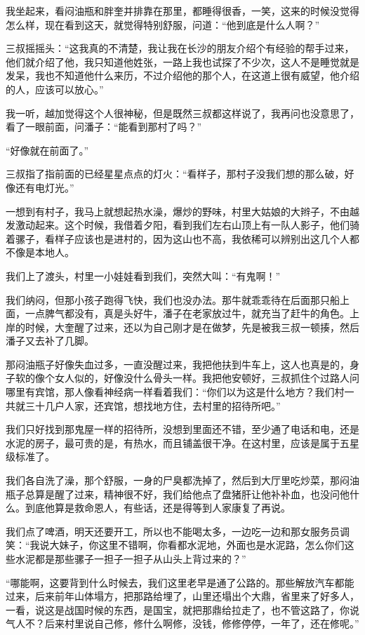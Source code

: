 我坐起来，看闷油瓶和胖奎并排靠在那里，都睡得很香，一笑，这来的时候没觉得怎么样，现在看到这天，就觉得特别舒服，问道：“他到底是什么人啊？”

三叔摇摇头：“这我真的不清楚，我让我在长沙的朋友介绍个有经验的帮手过来，他们就介绍了他，我只知道他姓张，一路上我也试探了不少次，这人不是睡觉就是发呆，我也不知道他什么来历，不过介绍他的那个人，在这道上很有威望，他介绍的人，应该可以放心。”

我一听，越加觉得这个人很神秘，但是既然三叔都这样说了，我再问也没意思了，看了一眼前面，问潘子：“能看到那村了吗？”

“好像就在前面了。”

三叔指了指前面的已经星星点点的灯火：“看样子，那村子没我们想的那么破，好像还有电灯光。”

一想到有村子，我马上就想起热水澡，爆炒的野味，村里大姑娘的大辫子，不由越发激动起来。这个时候，我借着夕阳，看到我们左右山顶上有一队人影子，他们骑着骡子，看样子应该也是进村的，因为这山也不高，我依稀可以辨别出这几个人都不像是本地人。

我们上了渡头，村里一小娃娃看到我们，突然大叫：“有鬼啊！”

我们纳闷，但那小孩子跑得飞快，我们也没办法。那牛就乖乖待在后面那只船上面，一点脾气都没有，真是头好牛，潘子在老家放过牛，就充当了赶牛的角色。上岸的时候，大奎醒了过来，还以为自己刚才是在做梦，先是被我三叔一顿揍，然后潘子又去补了几脚。

那闷油瓶子好像失血过多，一直没醒过来，我把他扶到牛车上，这人也真是的，身子软的像个女人似的，好像没什么骨头一样。我把他安顿好，三叔抓住个过路人问哪里有宾馆，那人像看神经病一样看着我们：“你们以为这是什么地方？我们村一共就三十几户人家，还宾馆，想找地方住，去村里的招待所吧。”

我们只好找到那鬼屋一样的招待所，没想到里面还不错，至少通了电话和电，还是水泥的房子，最可贵的是，有热水，而且铺盖很干净。在这村里，应该是属于五星级标准了。

我们各自洗了澡，那个舒服，一身的尸臭都洗掉了，然后到大厅里吃炒菜，那闷油瓶子总算是醒了过来，精神很不好，我们给他点了盘猪肝让他补补血，也没问他什么。到底他算是救命恩人，有些话，还是得等到人家康复了再说。

我们点了啤酒，明天还要开工，所以也不能喝太多，一边吃一边和那女服务员调笑：“我说大妹子，你这里不错啊，你看都水泥地，外面也是水泥路，怎么你们这些水泥都是那些骡子一担子一担子从山头上背过来的？”

“哪能啊，这要背到什么时候去，我们这里老早是通了公路的。那些解放汽车都能过来，后来前年山体塌方，把那路给埋了，山里还塌出个大鼎，省里来了好多人，一看，说这是战国时候的东西，是国宝，就把那鼎给拉走了，也不管这路了，你说气人不？后来村里说自己修，修什么啊修，没钱，修修停停，一年了，还在修呢。”

